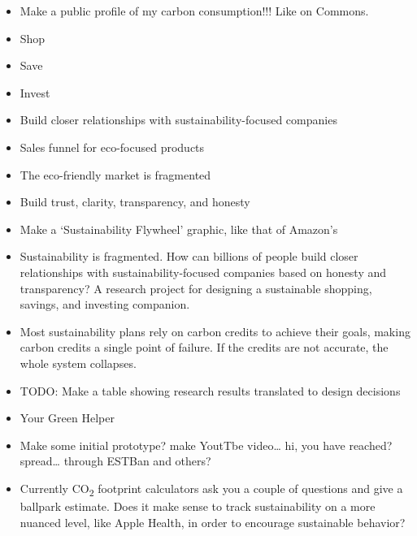 \documentclass[
  letterpaper,
  DIV=11,
  numbers=noendperiod]{scrartcl}
\begin{document}
\begin{itemize}
\item
  Make a public profile of my carbon consumption!!! Like on Commons.
\item
  Shop
\item
  Save
\item
  Invest
\item
  Build closer relationships with sustainability-focused companies
\item
  Sales funnel for eco-focused products
\item
  The eco-friendly market is fragmented
\item
  Build trust, clarity, transparency, and honesty
\item
  Make a `Sustainability Flywheel' graphic, like that of Amazon's
\item
  Sustainability is fragmented. How can billions of people build closer
  relationships with sustainability-focused companies based on honesty
  and transparency? A research project for designing a sustainable
  shopping, savings, and investing companion.
\item
  Most sustainability plans rely on carbon credits to achieve their
  goals, making carbon credits a single point of failure. If the credits
  are not accurate, the whole system collapses.
\item
  TODO: Make a table showing research results translated to design
  decisions
\item
  Your Green Helper
\item
  Make some initial prototype? make YoutTbe video\ldots{} hi, you have
  reached? spread\ldots{} through ESTBan and others?
\item
  Currently CO\textsubscript{2} footprint calculators ask you a couple
  of questions and give a ballpark estimate. Does it make sense to track
  sustainability on a more nuanced level, like Apple Health, in order to
  encourage sustainable behavior?
\end{itemize}
\end{document}

